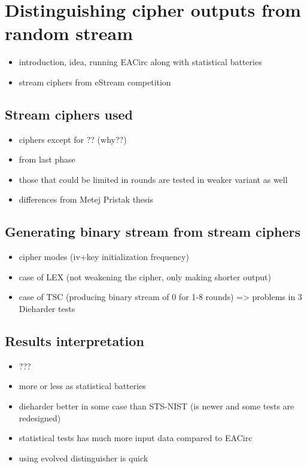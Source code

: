 \documentclass[12pt,oneside]{fithesis2}
\begin{document}
\chapter{Distinguishing cipher outputs from random stream}
\label{chap:distinguish-cipher}

\begin{itemize}
\item introduction, idea, running EACirc along with statistical batteries
\item stream ciphers from eStream competition
\end{itemize}

\section{Stream ciphers used}
\label{sec:estream-ciphers}

\begin{itemize}
\item ciphers except for ?? (why??)
\item from last phase
\item those that could be limited in rounds are tested in weaker variant as well
\item differences from Metej Pristak thesis
\end{itemize}

\section{Generating binary stream from stream ciphers}
\label{sec:estream-settings}

\begin{itemize}
\item cipher modes (iv+key initialization frequency)
\item case of LEX (not weakening the cipher, only making shorter output)
\item case of TSC (producing binary stream of 0 for 1-8 rounds) => problems in 3 Dieharder tests
\end{itemize}

\section{Results interpretation}
\label{sec:estream-results}

\begin{itemize}
\item ???
\item more or less as statistical batteries
\item dieharder better in some case than STS-NIST (is newer and some tests are redesigned)
\item statistical tests has much more input data compared to EACirc
\item using evolved distinguisher is quick
\end{itemize}
\end{document}

